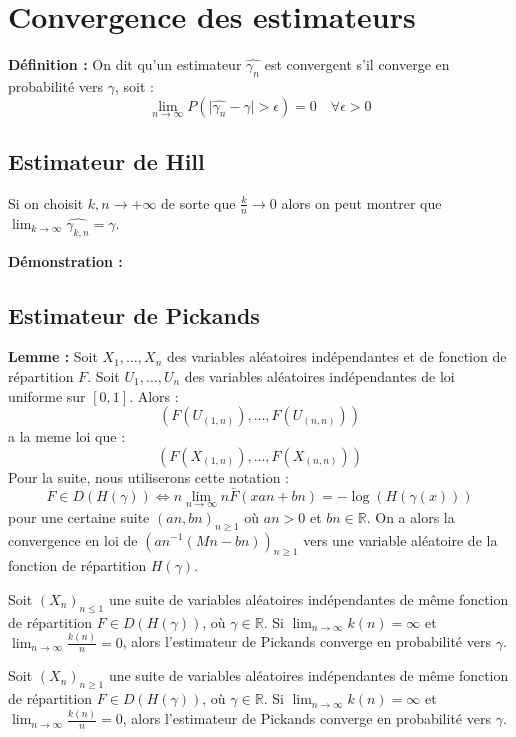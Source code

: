 \documentclass{article}
\begin{document}
\section{Convergence des estimateurs}

\textbf{Définition :}
On dit qu'un estimateur \(\hat{\gamma_{n}}\) est convergent s'il converge en probabilité vers \(\gamma\), soit :
\[
\lim_{n \to \infty} P(\lvert \hat{\gamma_{n}} - \gamma \rvert > \epsilon) = 0 \quad \forall \epsilon > 0
\]
\subsection{Estimateur de Hill}

Si on choisit \(k,n \to +\infty\) de sorte que \(\frac{k}{n} \to 0\) alors on peut montrer que \(\lim_{k \to \infty} \hat{\gamma_{k,n}} = \gamma\).

\textbf{Démonstration :}

\subsection{Estimateur de Pickands}
\textbf{Lemme :} Soit \(X_1, \dots, X_n\) des variables aléatoires indépendantes et de fonction de répartition \(F\). Soit \(U_1, \dots, U_n\) des variables aléatoires indépendantes de loi uniforme sur $[0,1]$. Alors :
\[
(F(U_{(1,n)}), \dots, F(U_{(n,n)}))
\]
a la meme loi que :
\[
(F(X_{(1,n)}), \dots, F(X_{(n,n)}))
\]
Pour la suite, nous utiliserons cette notation :
\[
F \in D(H(\gamma)) \Longleftrightarrow n \lim_{n \to \infty} n \bar{F}(xan + bn) = -\log(H(\gamma(x)))
\]
pour une certaine suite \((an,bn)_{n\geq 1}\) où \(an > 0\) et \(bn \in \mathbb{R}\).
On a alors la convergence en loi de \((an^{-1}(Mn-bn))_{n \geq 1}\) vers une variable aléatoire de la fonction de répartition \(H(\gamma)\).

Soit \((X_n)_{n \leq 1}\) une suite de variables aléatoires indépendantes de même fonction de répartition \(F \in D(H(\gamma))\), où \(\gamma \in \mathbb{R}\).
Si \(\lim_{n \to \infty} k(n) = \infty\) et \(\lim_{n \to \infty} \frac{k(n)}{n} = 0\), alors l'estimateur de Pickands converge en probabilité vers \(\gamma\).

Soit \((X_n)_{n \geq 1}\) une suite de variables aléatoires indépendantes de même fonction de répartition \(F \in D(H(\gamma))\), où \(\gamma \in \mathbb{R}\).
Si \(\lim_{n \to \infty} k(n) = \infty\) et \(\lim_{n \to \infty} \frac{k(n)}{n} = 0\), alors l'estimateur de Pickands converge en probabilité vers \(\gamma\).
\end{document}
